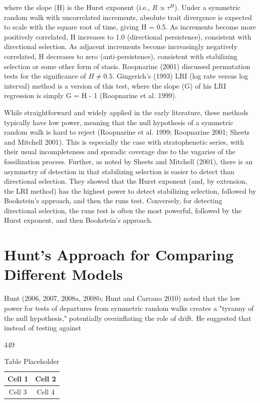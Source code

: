 \documentclass{article}
\begin{document}
where the slope (H) is the Hurst exponent (i.e.,  $ R \propto \tau^{H} $). Under a symmetric random walk with uncorrelated increments, absolute trait divergence is expected to scale with the square root of time, giving H = 0.5. As increments become more positively correlated, H increases to 1.0 (directional persistence), consistent with directional selection. As adjacent increments become increasingly negatively correlated, H decreases to zero (anti-persistence), consistent with stabilizing selection or some other form of stasis. Roopnarine (2001) discussed permutation tests for the significance of  $ H \neq 0.5 $. Gingerich's (1993) LRI (log rate versus log interval) method is a version of this test, where the slope (G) of his LRI regression is simply G = H - 1 (Roopnarine et al. 1999).

While straightforward and widely applied in the early literature, these methods typically have low power, meaning that the null hypothesis of a symmetric random walk is hard to reject (Roopnarine et al. 1999; Roopnarine 2001; Sheets and Mitchell 2001). This is especially the case with stratophenetic series, with their usual incompleteness and sporadic coverage due to the vagaries of the fossilization process. Further, as noted by Sheets and Mitchell (2001), there is an asymmetry of detection in that stabilizing selection is easier to detect than directional selection. They showed that the Hurst exponent (and, by extension, the LRI method) has the highest power to detect stabilizing selection, followed by Bookstein's approach, and then the runs test. Conversely, for detecting directional selection, the runs test is often the most powerful, followed by the Hurst exponent, and then Bookstein's approach.

\section{Hunt's Approach for Comparing Different Models}
Hunt (2006, 2007, 2008a, 2008b; Hunt and Carrano 2010) noted that the low power for tests of departures from symmetric random walks creates a "tyranny of the null hypothesis," potentially overinflating the role of drift. He suggested that instead of testing against

449

\begin{table}[h]
\centering
\begin{tabular}{|c|c|}
\hline
Cell 1 & Cell 2 \\
\hline
Cell 3 & Cell 4 \\
\hline
\end{tabular}
\caption{Table Placeholder}
\end{table}
\end{document}
